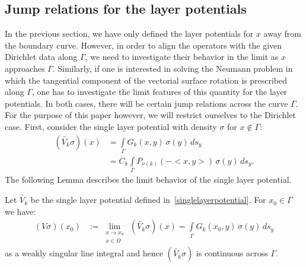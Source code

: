 \documentclass[final]{siamltex}
\newcommand{\C}{C_k}
\begin{document}
\subsection{Jump relations for the layer potentials} 
In the previous section, we have only defined the layer potentials for
$x$ away from the boundary curve. However, in order to align the
operators with the given Dirichlet data along $\Gamma$, we need to
investigate their behavior in the limit as $x$ approaches $\Gamma$.
Similarly, if one is interested in solving the Neumann problem in which
the tangential component of the vectorial surface rotation is
prescribed along $\Gamma$, one has to investigate the limit features of
this quantity for the layer potentials. In both cases, there will be
certain jump relations across the curve $\Gamma$. For the purpose of
this paper however, we will restrict ourselves to the Dirichlet case.
First, consider the single layer potential with density $\sigma$ for $x
\notin \Gamma$:
\begin{align*}
  (\widetilde{V_k}\sigma)(x) & =  \int\limits_\Gamma
  G_k(x,y)\,\sigma(y)\,ds_{y} \\
  & = \C \int\limits_\Gamma P_{\nu(k)}(-<x,y>)\,\sigma(y)\,ds_{y}.
\end{align*}
The following Lemma describes the limit behavior of the single layer potential.
\begin{lemma} Let $\widetilde{V_k}$ be the single layer potential defined in~\eqref{singlelayerpotential}. For $x_{0}\in\Gamma$ we have:
\begin{align*} 
  (V\sigma)(x_0) & := \lim\limits_{\substack{
      x \to x_{0} \\ x \in \Omega}}
  \,(\widetilde{V_k}\sigma)(x) = \int\limits_\Gamma G_k(x_{0},y)\,\sigma(y)\,ds_{y}
\end{align*}
as a weakly singular line integral and hence $(\widetilde{V_k}\sigma)$ is continuous across $\Gamma$.
\end{lemma}
\end{document}
